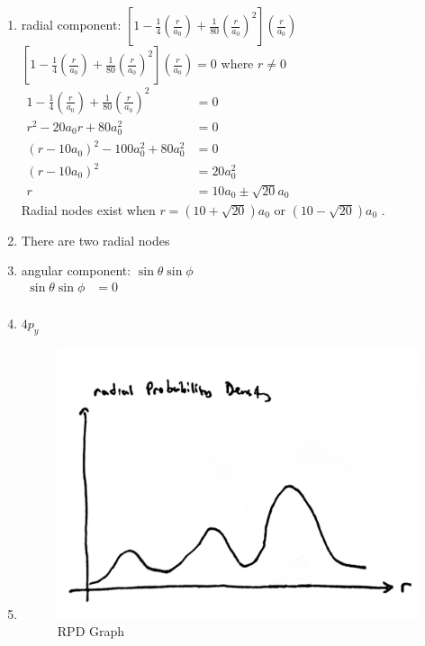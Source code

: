 \documentclass[a4paper, fleqn]{article}
\begin{document}
\begin{enumerate}[label=(\alph{*})]
\item radial component: $[1-\frac{1}{4}\left(\frac{r}{a_0}\right)+\frac{1}{80}\left(\frac{r}{a_0}\right)^2]\left(\frac{r}{a_0}\right)$\\
$[1-\frac{1}{4}\left(\frac{r}{a_0}\right)+\frac{1}{80}\left(\frac{r}{a_0}\right)^2]\left(\frac{r}{a_0}\right)=0$ where $r\neq0$\\
$\begin{aligned}1-\frac{1}{4}\left(\frac{r}{a_0}\right)+\frac{1}{80}\left(\frac{r}{a_0}\right)^2&=0\\r^2-20a_0r+80a_0^2&=0\\\left(r-10a_0\right)^2-100a_0^2+80a_0^2&=0\\(r-10a_0)^2&=20a_0^2\\r&=10a_0\pm\sqrt{20}a_0\end{aligned}$\\
Radial nodes exist when $r=(10+\sqrt{20})a_0\text{  or  }(10-\sqrt{20})a_0$ .
\item There are two radial nodes
\item angular component: $\sin\theta\sin\phi$\\
$\begin{aligned}\sin\theta\sin\phi&=0\\\end{aligned}$
\item $4p_y$
\item \begin{figure}[h!]
\includegraphics[width=\linewidth]{./assets/201802062208.jpg}
\caption{RPD Graph}
\label{fig:graph3.1}
\end{figure}
\end{enumerate}
\end{document}
